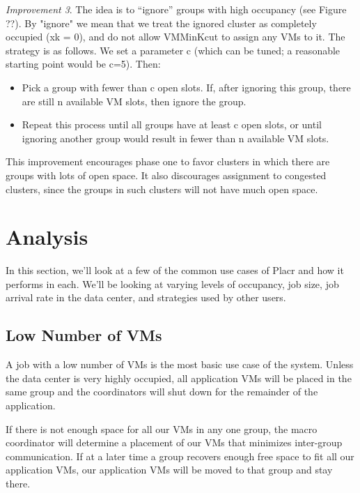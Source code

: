 \documentclass[11pt]{article}
\begin{document}
\textit{Improvement 3}. The idea is to ``ignore'' groups with high occupancy (see Figure ??).  By "ignore" we mean that we treat the ignored cluster as completely occupied (xk = 0), and do not allow VMMinKcut to assign any VMs to it.  The strategy is as follows.  We set a parameter c (which can be tuned; a reasonable starting point would be c=5).  Then:
\vspace{-4mm}
\begin{itemize}
  \item 
Pick a group with fewer than c open slots.  If, after ignoring this group, there are still n available VM slots, then ignore the group.
  \item
Repeat this process until all groups have at least c open slots, or until ignoring another group would result in fewer than n available VM slots.
\end{itemize}

This improvement encourages phase one to favor clusters in which there are groups with lots of open space.  It also discourages assignment to congested clusters, since the groups in such clusters will not have much open space.





\FloatBarrier
\section{Analysis}

In this section, we'll look at a few of the common use cases of Placr and how it performs in each.  We'll be looking at varying levels of occupancy, job size, job arrival rate in the data center, and strategies used by other users.

\subsection{Low Number of VMs}

A job with a low number of VMs is the most basic use case of the system.  Unless the data center is very highly occupied, all application VMs will be placed in the same group and the coordinators will shut down for the remainder of the application.

If there is not enough space for all our VMs in any one group, the macro coordinator will determine a placement of our VMs that minimizes inter-group communication.  If at a later time a group recovers enough free space to fit all our application VMs, our application VMs will be moved to that group and stay there.
\end{document}

